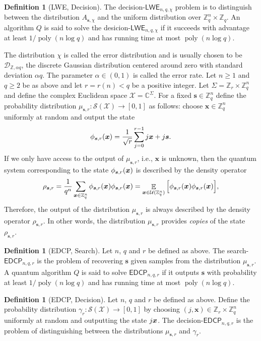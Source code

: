 \documentclass[11pt]{article}
\theoremstyle{plain}
\theoremstyle{definition}
\newtheorem{definition}[theorem]{Definition}
\DeclareMathOperator{\poly}{poly}
\DeclareMathOperator{\E}{\mathbb{E}}
\let\ket\relax
\DeclarePairedDelimiter{\ket}{\lvert}{\rangle}
\let\bra\relax
\DeclarePairedDelimiter{\bra}{\langle}{\rvert}
\def\C{\mathbb{C}}
\def\Z{\mathbb{Z}}
\def\lwe{\mathsf{LWE}}
\def\edcp{\mathsf{EDCP}}
\def\X{\mathcal{X}}
\def\SX{\mathcal{S(X)}}
\def\U{\mathcal{U}}
\begin{document}
\begin{definition}[LWE, Decision]
    The decision-$\lwe_{n, q, \chi}$ problem is to distinguish between the distribution $A_{\bm{s}, \chi}$ and the uniform distribution over $\Z_q^n \times \Z_q$. An algorithm $Q$ is said to solve the desicion-$\lwe_{n, q, \chi}$ if it succeeds with advantage at least $1 / \poly(n\log q)$ and has running time at most $\poly(n\log q)$. 
\end{definition}

The distribution $\chi$ is called the error distribution and is usually chosen to be $\mathcal{D}_{\Z, \alpha q}$, the discrete Gaussian distribution centered around zero with standard deviation $\alpha q$. The parameter $\alpha \in (0, 1)$ is called the error rate. Let $n \ge 1$ and $q \ge 2$ be as above and let $r = r(n) < q$ be a positive integer. Let $\Sigma = \Z_r \times \Z_q^n$ and define the complex Euclidean space $\X = \C^\Sigma$. For a fixed $\bm{s} \in \Z_q^n$ define the probability distribution $\mu_{\bm{s}, r}: \SX \rightarrow [0, 1]$ as follows: choose $\bm{x} \in \Z_q^n$ uniformly at random and output the state
\[ \ket{\phi_{\bm{s}, r}(\bm{x})} = \frac{1}{\sqrt{r}} \sum_{j = 0}^{r - 1}\ket{j}\ket{\bm{x} + j\bm{s}}. \]
If we only have access to the output of $\mu_{\bm{s}, r}$, i.e., $\bm{x}$ is unknown, then the quantum system corresponding to the state $\ket{\phi_{\bm{s}, r}(\bm{x})}$ is described by the density operator
\[ \rho_{\bm{s}, r} = \frac{1}{q^n} \sum_{\bm{x} \in \Z_q^n} \ket{\phi_{\bm{s}, r}(\bm{x})} \bra{\phi_{\bm{s}, r}(\bm{x})} = \E_{\bm{x} \in \U(\Z_q^n)} \Big[ \ket{\phi_{\bm{s}, r}(\bm{x})} \bra{\phi_{\bm{s}, r}(\bm{x})} \Big], \]
Therefore, the output of the distribution $\mu_{\bm{s}, r}$ is always described by the density operator $\rho_{\bm{s}, r}$. In other words, the distribution $\mu_{\bm{s}, r}$ provides \textit{copies} of the state $\rho_{\bm{s}, r}$.

\begin{definition}[EDCP, Search]
    Let $n$, $q$ and $r$ be defined as above. The search-$\edcp_{n, q, r}$ is the problem of recovering $\bm{s}$ given samples from the distribution $\mu_{\bm{s}, r}$. A quantum algorithm $Q$ is said to solve $\edcp_{n, q, r}$ if it outputs $\bm{s}$ with probability at least $1 / \poly(n\log q)$ and has running time at most $\poly(n\log q)$.
\end{definition}

\begin{definition}[EDCP, Decision]
    \label{def:d-edcp}
    Let $n$, $q$ and $r$ be defined as above. Define the probability distribution $\gamma_r: \SX \rightarrow [0, 1]$ by choosing $(j, \bm{x}) \in \Z_r \times \Z_q^n$ uniformly at random and outputting the state $\ket{j}\ket{\bm{x}}$. The decision-$\edcp_{n, q, r}$ is the problem of distinguishing between the distributions $\mu_{\bm{s}, r}$ and $\gamma_r$.
\end{definition}
\end{document}
